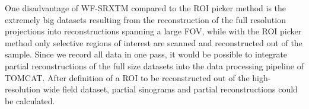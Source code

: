 One disadvantage of WF-SRXTM compared to the ROI picker method is the extremely big datasets resulting from the reconstruction of the full resolution projections into reconstructions spanning a large FOV, while with the ROI picker method only selective regions of interest are scanned and reconstructed out of the sample. Since we record all data in one pass, it would be possible to integrate partial reconstructions of the full size datasets into the data processing pipeline of TOMCAT. After definition of a ROI to be reconstructed out of the high-resolution wide field dataset, partial sinograms and partial reconstructions could be calculated.